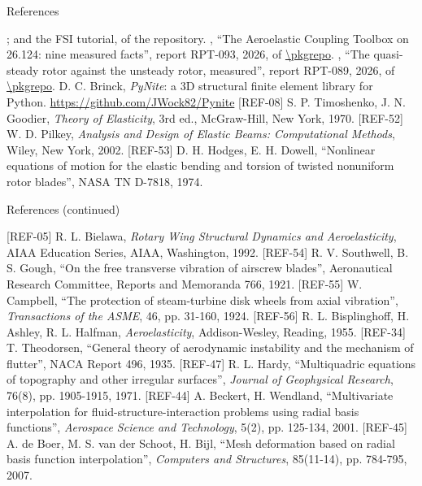 \documentclass[aspectratio=169,11pt]{beamer}
\begin{document}
\begin{frame}{References}
\begin{reflist}
   ; and the FSI tutorial,
         of the repository.
   \pkgauthor, ``The Aeroelastic Coupling Toolbox on 26.124: nine
        measured facts'', report RPT-093, 2026,  of
        \url{\pkgrepo}.
   \pkgauthor, ``The quasi-steady rotor against the unsteady rotor,
        measured'', report RPT-089, 2026,  of \url{\pkgrepo}.
   \recordsref
   D. C. Brinck, \emph{PyNite}: a 3D structural finite element library
        for Python. \url{https://github.com/JWock82/Pynite}
   [REF-08] S. P. Timoshenko, J. N. Goodier, \emph{Theory of Elasticity}, 3rd ed.,
        McGraw-Hill, New York, 1970.
   [REF-52] W. D. Pilkey, \emph{Analysis and Design of Elastic Beams:
        Computational Methods}, Wiley, New York, 2002.
   [REF-53] D. H. Hodges, E. H. Dowell, ``Nonlinear equations of motion for the
        elastic bending and torsion of twisted nonuniform rotor blades'',
        NASA TN D-7818, 1974.
\end{reflist}
\end{frame}

\begin{frame}{References (continued)}
\begin{reflist}
  \setcounter{enumi}{8}
   [REF-05] R. L. Bielawa, \emph{Rotary Wing Structural Dynamics and
        Aeroelasticity}, AIAA Education Series, AIAA, Washington, 1992.
   [REF-54] R. V. Southwell, B. S. Gough, ``On the free transverse vibration of
        airscrew blades'', Aeronautical Research Committee, Reports and
        Memoranda 766, 1921.
   [REF-55] W. Campbell, ``The protection of steam-turbine disk wheels from axial
        vibration'', \emph{Transactions of the ASME}, 46, pp. 31-160, 1924.
   [REF-56] R. L. Bisplinghoff, H. Ashley, R. L. Halfman, \emph{Aeroelasticity},
        Addison-Wesley, Reading, 1955.
   [REF-34] T. Theodorsen, ``General theory of aerodynamic instability and the
        mechanism of flutter'', NACA Report 496, 1935.
   [REF-47] R. L. Hardy, ``Multiquadric equations of topography and other
        irregular surfaces'', \emph{Journal of Geophysical Research}, 76(8),
        pp. 1905-1915, 1971.
   [REF-44] A. Beckert, H. Wendland, ``Multivariate interpolation for
        fluid-structure-interaction problems using radial basis functions'',
        \emph{Aerospace Science and Technology}, 5(2), pp. 125-134, 2001.
   [REF-45] A. de Boer, M. S. van der Schoot, H. Bijl, ``Mesh deformation based
        on radial basis function interpolation'', \emph{Computers and
        Structures}, 85(11-14), pp. 784-795, 2007.
\end{reflist}
\end{frame}
\end{document}
